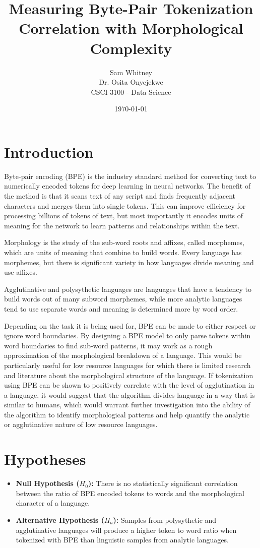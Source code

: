 \documentclass[11pt]{article}
\title{Measuring Byte-Pair Tokenization Correlation with Morphological Complexity}
\author{Sam Whitney \\ Dr. Osita Onyejekwe \\ CSCI 3100 - Data Science }
\date{\today}
\begin{document}
\maketitle

\section{Introduction}

Byte-pair encoding (BPE) is the industry standard method for converting text to numerically encoded tokens for deep learning in neural networks. The benefit of the method is that it scans text of any script and finds frequently adjacent characters and merges them into single tokens. This can improve efficiency for processing billions of tokens of text, but most importantly it encodes units of meaning for the network to learn patterns and relationships within the text. 

Morphology is the study of the sub-word roots and affixes, called morphemes, which are units of meaning that combine to build words. Every language has morphemes, but there is significant variety in how languages divide meaning and use affixes. 

Agglutinative and polysythetic languages are languages that have a tendency to build words out of many subword morphemes, while more analytic languages tend to use separate words and meaning is determined more by word order. 

Depending on the task it is being used for, BPE can be made to either respect or ignore word boundaries. By designing a BPE model to only parse tokens within word boundaries to find sub-word patterns, it may work as a rough approximation of the morphological breakdown of a language. This would be particularly useful for low resource languages for which there is limited research and literature about the morphological structure of the language. If tokenization using BPE can be shown to positively correlate with the level of agglutination in a language, it would suggest that the algorithm divides language in a way that is similar to humans, which would warrant further investigation into the ability of the algorithm to identify morphological patterns and help quantify the analytic or agglutinative nature of low resource languages. 

\section{Hypotheses}
\begin{itemize}
    \item \textbf{Null Hypothesis ($H_0$):}  There is no statistically significant correlation between the ratio of BPE encoded tokens to words and the morphological character of a language.
    \item \textbf{Alternative Hypothesis ($H_a$):} Samples from polysythetic and agglutinative languages will produce a higher token to word ratio when tokenized with BPE than linguistic samples from analytic languages.
\end{itemize}
\end{document}
